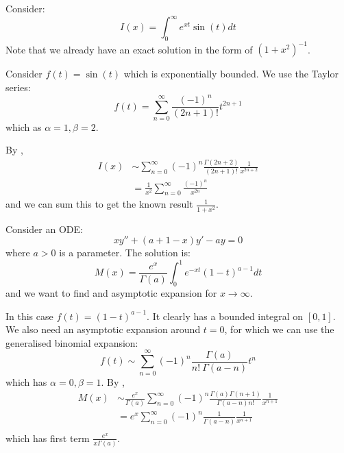 \documentclass[../Main.tex]{subfiles}
\begin{document}
\begin{example}
    Consider:
    \begin{equation*}
        I(x) = \int_{0}^{\infty} e^{xt} \sin(t) dt
    \end{equation*}
    Note that we already have an exact solution in the form of $(1 + x^2)^{-1}$.

    Consider $f(t) = \sin(t)$ which is exponentially bounded. We use the Taylor series:
    \begin{equation*}
        f(t) = \sum_{n=0}^{\infty} \frac{(-1)^n}{(2n+1)!}t^{2n + 1}
    \end{equation*}
    which as $\alpha = 1, \beta = 2$.

    By ,
    \begin{align*}
        I(x) &\sim \sum_{n=0}^{\infty} (-1)^n \frac{\Gamma(2n+2)}{(2n+1)!} \frac{1}{x^{2n+2}} \\
        &= \frac{1}{x^2} \sum_{n=0}^{\infty} \frac{(-1)^n}{x^{2n}}
    \end{align*}
    and we can sum this to get the known result $\frac{1}{1 + x^2}$.
\end{example}
\begin{example}
    Consider an ODE:
    \begin{equation*}
        xy'' + (a + 1 - x) y' - ay = 0
    \end{equation*}
    where $a > 0$ is a parameter. The solution is:
    \begin{equation*}
        M(x) = \frac{e^x}{\Gamma(a)} \int_{0}^{1} e^{-xt} (1 - t)^{a-1} dt
    \end{equation*}
    and we want to find and asymptotic expansion for $x \to \infty$.

    In this case $f(t) = (1-t)^{a-1}$. It clearly has a bounded integral on $[0, 1]$. We also need an asymptotic expansion around $t = 0$, for which we can use the generalised binomial expansion:
    \begin{equation*}
        f(t) \sim \sum_{n=0}^{\infty} (-1)^n \frac{\Gamma(a)}{n!~\Gamma(a-n)} t^n
    \end{equation*}
    which has $\alpha= 0, \beta = 1$. By ,
    \begin{align*}
        M(x) &\sim \frac{e^x}{\Gamma(a)} \sum_{n=0}^{\infty} (-1)^n \frac{\Gamma(a) \Gamma(n+1)}{\Gamma(a-n) n!} \frac{1}{x^{n+1}} \\
        &= e^x \sum_{n=0}^{\infty} (-1)^n \frac{1}{\Gamma(a-n)} \frac{1}{x^{n+1}} \\
    \end{align*}
    which has first term $\frac{e^x}{x\Gamma(a)}$. 
\end{example}
\end{document}
